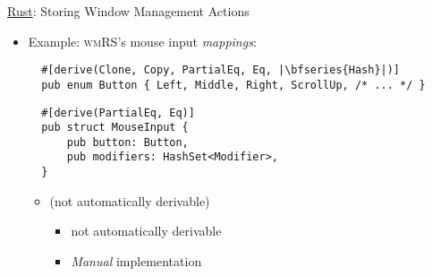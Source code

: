 \begin{frame}[fragile]{\underline{Rust}: Storing Window Management Actions \hfill {\footnotesize \currentname}}


    \begin{itemize}

        \item Example: \textsc{wmRS}'s mouse input \textit{mappings}:\\[3pt]
\begin{verbatim}
  #[derive(Clone, Copy, PartialEq, Eq, |\bfseries{Hash}|)]
  pub enum Button { Left, Middle, Right, ScrollUp, /* ... */ }
\end{verbatim}
\begin{verbatim}
  #[derive(PartialEq, Eq)]
  pub struct MouseInput {
      pub button: Button,
      pub modifiers: HashSet<Modifier>,
  }
\end{verbatim}

    \vspace*{5pt}\begin{itemize}

        \item {} (not automatically derivable)
            \begin{itemize}
                \item {} not automatically derivable
                \item \textit{Manual} implementation
            \end{itemize}

    \end{itemize}

    \end{itemize}

    \vfill

\end{frame}

